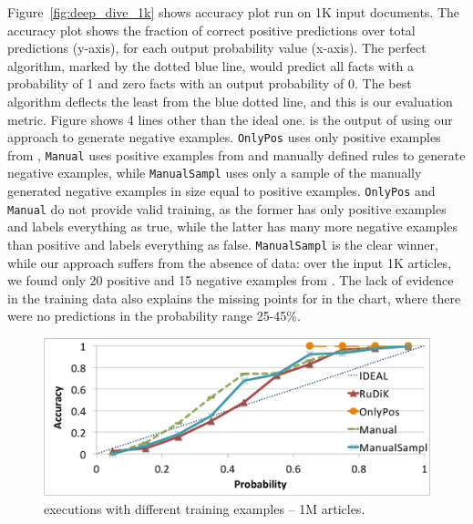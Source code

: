 %
Figure~\ref{fig:deep_dive_1k} shows \deepdive accuracy plot run on 1K input documents. The accuracy plot shows the fraction of correct positive predictions over total predictions (y-axis), for each output probability value (x-axis). The perfect algorithm, marked by the dotted blue line, would predict all facts with a probability of 1 and zero facts with an output probability of 0.
The best algorithm deflects the least from the blue dotted line, and this is our evaluation metric.
Figure shows 4 lines other than the ideal one. \krd is the output of \deepdive using our approach to generate negative examples. \texttt{OnlyPos} uses only positive examples from \dbpedia, \texttt{Manual} uses positive examples from \dbpedia and manually defined rules to generate negative examples, while \texttt{ManualSampl} uses only a sample of the manually generated negative examples in size equal to positive examples. \texttt{OnlyPos} and \texttt{Manual} do not provide valid training, as the former has only positive examples and labels everything as true, while the latter has many more negative examples than positive and labels everything as false. \texttt{ManualSampl} is the clear winner, while our approach suffers from the absence of data: over the input 1K articles, we found only 20 positive and 15 negative examples from \dbpedia.
The lack of evidence in the training data also explains the missing points for \krd in the chart, where there were no predictions in the probability range 25-45\%.

\begin{figure}[ht]
	\centering
	\includegraphics[width=.95\columnwidth]{include/figure/deepDive1M.pdf}
		\vspace{-1ex}
	\caption{\deepdive executions with different training examples -- 1M articles.}
	\label{fig:deep_dive_1M}
\end{figure}

